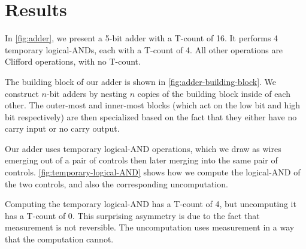 \documentclass[twocolumn,accepted=2018-05-25]{quantumarticle}
\begin{document}
\section*{Results}

In \autoref{fig:adder}, we present a 5-bit adder with a T-count of 16.
It performs 4 temporary logical-ANDs, each with a T-count of 4.
All other operations are Clifford operations, with no T-count.

The building block of our adder is shown in \autoref{fig:adder-building-block}.
We construct $n$-bit adders by nesting $n$ copies of the building block inside of each other.
The outer-most and inner-most blocks (which act on the low bit and high bit respectively) are then specialized based on the fact that they either have no carry input or no carry output.

Our adder uses temporary logical-AND operations, which we draw as wires emerging out of a pair of controls then later merging into the same pair of controls.
\autoref{fig:temporary-logical-AND} shows how we compute the logical-AND of the two controls, and also the corresponding uncomputation.

Computing the temporary logical-AND has a T-count of 4, but uncomputing it has a T-count of 0.
This surprising asymmetry is due to the fact that measurement is not reversible.
The uncomputation uses measurement in a way that the computation cannot.
\end{document}
